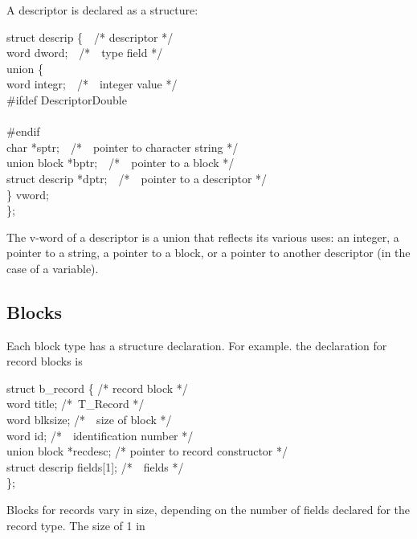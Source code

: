 A descriptor is declared as a structure:

\begin{iconcode}
\>struct descrip \{\ \ /* descriptor */\\
\>\>word dword;\ \ /*\ \ type field */\\
\>\>union \{\\
\>\>\>word integr;\ \ /*\ \ integer value */\\
{\color{blue}\#ifdef DescriptorDouble}\\
\>\>\\
{\color{blue}\#endif}\\
\>\>\>char *sptr;\ \ /*\ \ pointer to character string */\\
\>\>\>union block *bptr;\ \ /*\ \ pointer to a block */\\
\>\>\>struct descrip *dptr;\ \ /*\ \ pointer to a descriptor */\\
\>\>\} vword;\\
\>\};
\end{iconcode}

The v-word of a descriptor is a union that reflects its various uses:
an integer, a pointer to a string, a pointer to a block, or a pointer
to another descriptor (in the case of a variable).

\subsection{Blocks}

Each block type has a structure declaration. For example. the
declaration for record blocks is

\begin{iconcode}
\>struct b\_record \{\>\>\>\>\>\>\>\>\> /* record block */\\
\>\>word title;\>\>\>\>\>\>\>\> /*\ T\_Record */\\
\>\>word blksize;\>\>\>\>\>\>\>\> /*\ \ size of block */\\
\>\> word id;\>\>\>\>\>\>\>\> /*\ \ identification number */\\
\>\>union block *recdesc;\>\>\>\>\>\>\>\> /*   pointer to record constructor */\\
\>\>struct descrip fields[1];\>\>\>\>\>\>\>\> /*\ \ fields */\\
\>\};
\end{iconcode}

Blocks for records vary in size, depending on the number of fields
declared for the record type. The size of 1 in


